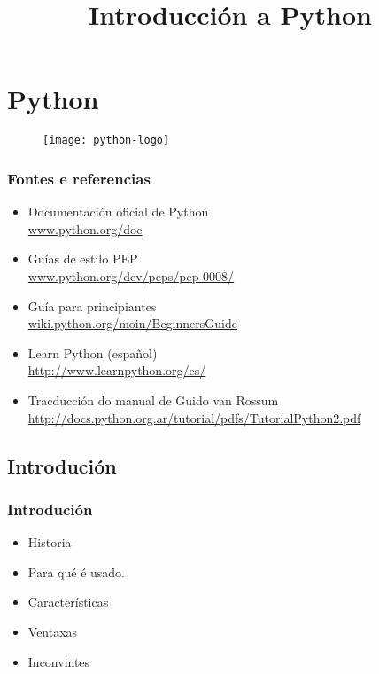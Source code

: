 
\title[Python]{Introducción a Python}
\date{}
\author[Fran Rúa/Breixo Camiña]{}
\institute{}

\section{Python}
\label{sec:Python}

\usebackgroundtemplate{}
\begin{frame}
  \titlepage
  \begin{figure}[H]
    \centering
    \texttt{[image: python-logo]}
  \end{figure}
\end{frame}


\begin{frame}
  \frametitle{Fontes e referencias}
  \begin{itemize}
  \item Documentación oficial de Python\\
    {\color{blue}\url{www.python.org/doc}}
  \item Guías de estilo PEP\\
    {\color{blue}\url{www.python.org/dev/peps/pep-0008/}}
  \item Guía para principiantes\\
    {\color{blue}\url{wiki.python.org/moin/BeginnersGuide}}
  \item Learn Python (español)\\
    {\color{blue}\url{http://www.learnpython.org/es/}}
  \item Tracducción do manual de Guido van Rossum
    {\color{blue}\url{http://docs.python.org.ar/tutorial/pdfs/TutorialPython2.pdf}}
  \end{itemize}
\end{frame}

\subsection{Introdución}
\label{subsec:Introducion}

\begin{frame}
  \frametitle{Introdución}
  \begin{itemize}
  \item Historia
  \item Para qué é usado.
  \item Características
  \item Ventaxas
  \item Inconvintes
  \end{itemize}
\end{frame}

